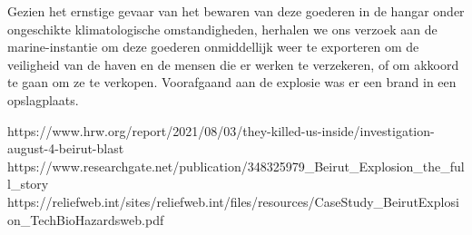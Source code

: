 Gezien het ernstige gevaar van het bewaren van deze goederen in de hangar onder ongeschikte klimatologische omstandigheden, herhalen we ons verzoek aan de marine-instantie om deze goederen onmiddellijk weer te exporteren om de veiligheid van de haven en de mensen die er werken te verzekeren, of om akkoord te gaan om ze te verkopen.
Voorafgaand aan de explosie was er een brand in een opslagplaats. 

https://www.hrw.org/report/2021/08/03/they-killed-us-inside/investigation-august-4-beirut-blast 
\cite{hrw03082021investigateBeirutBlast}
https://www.researchgate.net/publication/348325979_Beirut_Explosion_the_full_story 
\cite{souaibyElHussein112020Beirutstory}
https://reliefweb.int/sites/reliefweb.int/files/resources/CaseStudy_BeirutExplosion_TechBioHazardsweb.pdf 
\cite{ifrc2020chemicalexplosionBeirutPort}



